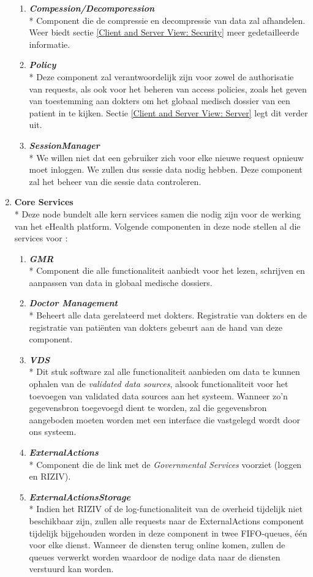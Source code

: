 \documentclass[a4paper,10pt]{article}
\begin{document}
\begin{enumerate}
\begin{enumerate}
\item \textit{\textbf{Compession/Decomporession}}\\*
Component die de compressie en decompressie van data zal afhandelen. Weer biedt sectie \ref{Client and Server View: Security} meer gedetailleerde informatie.
\item \textit{\textbf{Policy}}\\*
Deze component zal verantwoordelijk zijn voor zowel de authorisatie van requests, als ook voor het beheren van access policies, zoals het geven van toestemming aan dokters om het globaal medisch dossier van een patient in te kijken. Sectie \ref{Client and Server View: Server} legt dit verder uit.
\item \textit{\textbf{SessionManager}}\\*
We willen niet dat een gebruiker zich voor elke nieuwe request opnieuw moet inloggen. We zullen dus sessie data nodig hebben. Deze component zal het beheer van die sessie data controleren.
\end{enumerate}

\item \textbf{Core Services}\\*
Deze node bundelt alle kern services samen die nodig zijn voor de werking van het eHealth platform. Volgende componenten in deze node stellen al die services voor : 
\begin{enumerate}
 \item \textit{\textbf{GMR}}\\*
Component die alle functionaliteit aanbiedt voor het lezen, schrijven en aanpassen van data in globaal medische dossiers.
\item \textit{\textbf{Doctor Management}}\\*
Beheert alle data gerelateerd met dokters. Registratie van dokters en de registratie van patiënten van dokters gebeurt aan de hand van deze component.
\item \textit{\textbf{VDS}}\\*
Dit stuk software zal alle functionaliteit aanbieden om data te kunnen ophalen van de \textit{validated data sources}, alsook functionaliteit voor het toevoegen van validated data sources aan het systeem. Wanneer zo'n gegevensbron toegevoegd dient te worden, zal die gegevensbron aangeboden moeten worden met een interface die vastgelegd wordt door ons systeem. 
\item \textit{\textbf{ExternalActions}}\\*
Component die de link met de \textit{Governmental Services} voorziet (loggen en RIZIV).
\item \textit{\textbf{ExternalActionsStorage}}\\*
Indien het RIZIV of de log-functionaliteit van de overheid tijdelijk niet beschikbaar zijn, zullen alle requests naar de ExternalActions component tijdelijk bijgehouden worden in deze component in twee FIFO-queues, één voor elke dienst. Wanneer de diensten terug online komen, zullen de queues verwerkt worden waardoor de nodige data naar de diensten verstuurd kan worden.
\end{enumerate}


\end{enumerate}
\end{document}
